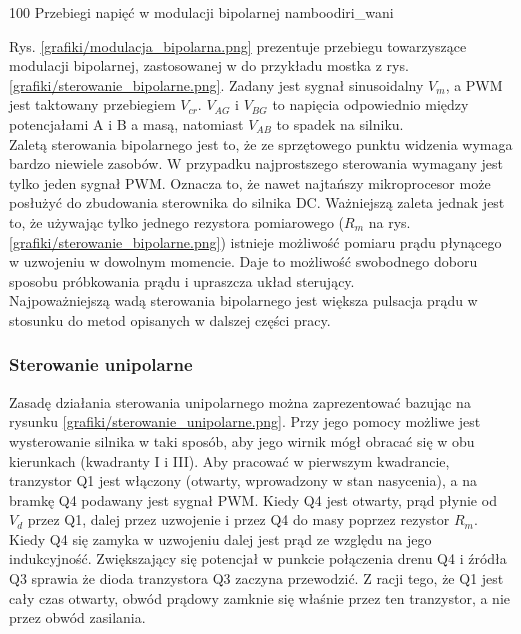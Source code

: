 	{100}
	{Przebiegi napięć w modulacji bipolarnej}
	{namboodiri_wani}
	
Rys. \ref{grafiki/modulacja_bipolarna.png} prezentuje przebiegu towarzyszące modulacji bipolarnej, zastosowanej w do przykładu mostka z rys. \ref{grafiki/sterowanie_bipolarne.png}. Zadany jest sygnał sinusoidalny $ V_m $, a PWM jest taktowany przebiegiem $ V_{cr} $. $ V_{AG} $ i $ V_{BG} $ to napięcia odpowiednio między potencjałami A i B a masą, natomiast $ V_{AB} $ to spadek na silniku. \\

Zaletą sterowania bipolarnego jest to, że ze sprzętowego punktu widzenia wymaga bardzo niewiele zasobów. W przypadku najprostszego sterowania wymagany jest tylko jeden sygnał PWM. Oznacza to, że nawet najtańszy mikroprocesor może posłużyć do zbudowania sterownika do silnika DC. Ważniejszą zaleta jednak jest to, że używając tylko jednego rezystora pomiarowego ($ R_m $ na rys. \ref{grafiki/sterowanie_bipolarne.png}) istnieje możliwość pomiaru prądu płynącego w uzwojeniu w dowolnym momencie. Daje to możliwość swobodnego doboru sposobu próbkowania prądu i upraszcza układ sterujący. \\

Najpoważniejszą wadą sterowania bipolarnego jest większa pulsacja prądu w stosunku do metod opisanych w dalszej części pracy.

\clearpage

\subsubsection{Sterowanie unipolarne}
\label{sss:moduni}

Zasadę działania sterowania unipolarnego można zaprezentować bazując na rysunku \ref{grafiki/sterowanie_unipolarne.png}. Przy jego pomocy możliwe jest wysterowanie silnika w taki sposób, aby jego wirnik mógł obracać się w obu kierunkach (kwadranty I i III). Aby pracować w pierwszym kwadrancie, tranzystor Q1 jest włączony (otwarty, wprowadzony w stan nasycenia), a na bramkę Q4 podawany jest sygnał PWM. Kiedy Q4 jest otwarty, prąd płynie od $ V_d $ przez Q1, dalej przez uzwojenie i przez Q4 do masy poprzez rezystor $ R_m $. Kiedy Q4 się zamyka w uzwojeniu dalej jest prąd ze względu na jego indukcyjność. Zwiększający się potencjał w punkcie połączenia drenu Q4 i źródła Q3 sprawia że dioda tranzystora Q3 zaczyna przewodzić. Z racji tego, że Q1 jest cały czas otwarty, obwód prądowy zamknie się właśnie przez ten tranzystor, a nie przez obwód zasilania. \\

